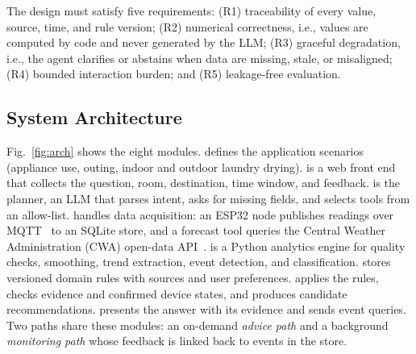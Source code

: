 The design must satisfy five requirements: (R1) traceability of every value, source, time, and rule version; (R2) numerical correctness, i.e., values are computed by code and never generated by the LLM; (R3) graceful degradation, i.e., the agent clarifies or abstains when data are missing, stale, or misaligned; (R4) bounded interaction burden; and (R5) leakage-free evaluation.

\subsection{System Architecture}
Fig.~\ref{fig:arch} shows the eight modules.  defines the application scenarios (appliance use, outing, indoor and outdoor laundry drying).  is a web front end that collects the question, room, destination, time window, and feedback.  is the planner, an LLM that parses intent, asks for missing fields, and selects tools from an allow-list.  handles data acquisition: an ESP32 node publishes readings over MQTT~\cite{mqtt5} to an SQLite store, and a forecast tool queries the Central Weather Administration (CWA) open-data API~\cite{cwa_api}.  is a Python analytics engine for quality checks, smoothing, trend extraction, event detection, and classification.  stores versioned domain rules with sources and user preferences.  applies the rules, checks evidence and confirmed device states, and produces candidate recommendations.  presents the answer with its evidence and sends event queries. Two paths share these modules: an on-demand \emph{advice path} and a background \emph{monitoring path} whose feedback is linked back to events in the store.

